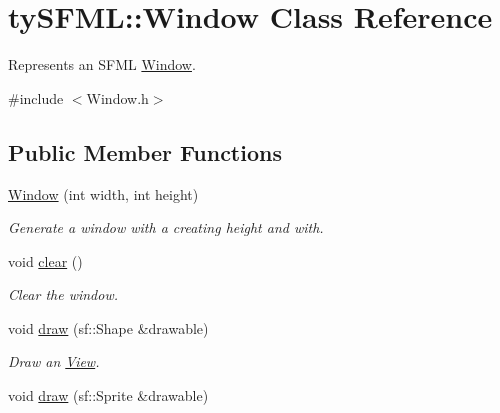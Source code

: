 \hypertarget{classty_s_f_m_l_1_1_window}{}\section{ty\+S\+F\+M\+L\+:\+:Window Class Reference}
\label{classty_s_f_m_l_1_1_window}


Represents an S\+F\+M\+L \hyperlink{classty_s_f_m_l_1_1_window}{Window}.  




{\ttfamily \#include $<$Window.\+h$>$}

\subsection*{Public Member Functions}
\begin{DoxyCompactItemize}
\item 
\hypertarget{classty_s_f_m_l_1_1_window_abe47bbe7630646e6de1e714f863e67fb}{}\hyperlink{classty_s_f_m_l_1_1_window_abe47bbe7630646e6de1e714f863e67fb}{Window} (int width, int height)\label{classty_s_f_m_l_1_1_window_abe47bbe7630646e6de1e714f863e67fb}

\begin{DoxyCompactList}\small\item\em Generate a window with a creating height and with. \end{DoxyCompactList}\item 
\hypertarget{classty_s_f_m_l_1_1_window_aef156fa5f809a8437c2d736d11bf5d2b}{}void \hyperlink{classty_s_f_m_l_1_1_window_aef156fa5f809a8437c2d736d11bf5d2b}{clear} ()\label{classty_s_f_m_l_1_1_window_aef156fa5f809a8437c2d736d11bf5d2b}

\begin{DoxyCompactList}\small\item\em Clear the window. \end{DoxyCompactList}\item 
\hypertarget{classty_s_f_m_l_1_1_window_aa464db3e42269c6f46a969756afd6929}{}void \hyperlink{classty_s_f_m_l_1_1_window_aa464db3e42269c6f46a969756afd6929}{draw} (sf\+::\+Shape \&drawable)\label{classty_s_f_m_l_1_1_window_aa464db3e42269c6f46a969756afd6929}

\begin{DoxyCompactList}\small\item\em Draw an \hyperlink{classty_s_f_m_l_1_1_view}{View}. \end{DoxyCompactList}\item 
\hypertarget{classty_s_f_m_l_1_1_window_ac0664155874f90191f7458b3b562978a}{}void \hyperlink{classty_s_f_m_l_1_1_window_ac0664155874f90191f7458b3b562978a}{draw} (sf\+::\+Sprite \&drawable)\label{classty_s_f_m_l_1_1_window_ac0664155874f90191f7458b3b562978a}


\end{DoxyCompactItemize}
